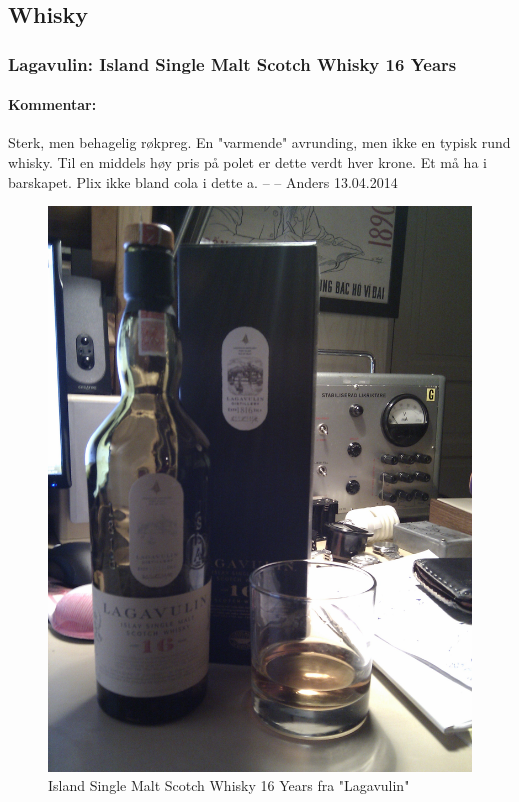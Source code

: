 \documentclass[12pt,a4paper,oneside,norsk]{article}
\begin{document}
\subsection{Whisky}
\subsubsection{Lagavulin: Island Single Malt Scotch Whisky 16 Years}

\paragraph{Kommentar:}Sterk, men behagelig røkpreg. En "varmende" avrunding, men ikke en typisk rund whisky. Til en middels høy pris på polet er dette verdt hver krone. Et må ha i barskapet. Plix ikke bland cola i dette a.
\newline
-- -- Anders 13.04.2014

\begin{figure} [H]
\centering
\includegraphics[scale=0.1, angle=0]{Bilder/Sprit/Lagavulin16aar.jpg}
\caption{Island Single Malt Scotch Whisky 16 Years fra "Lagavulin"}
\end{figure}
\end{document}
